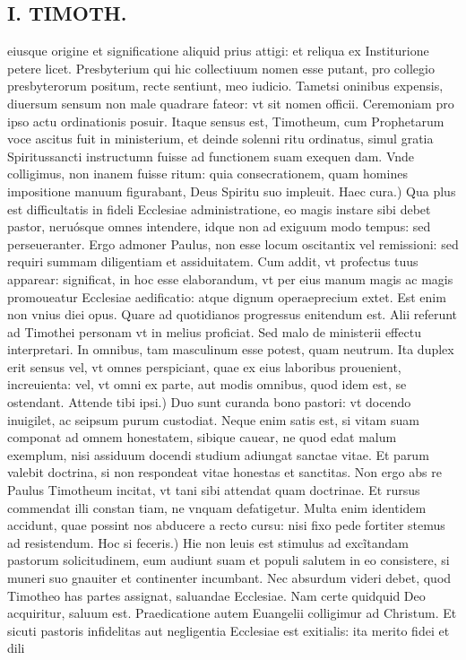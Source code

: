 \documentclass{article}
\begin{document}
\begin{pages}
\section*{I. TIMOTH. }
\marginpar{[ p.54 ]}\pstart eiusque origine et significatione aliquid prius attigi: et reliqua ex Institurione petere licet. Presbyterium qui hic collectiuum nomen esse putant, pro collegio presbyterorum positum, recte sentiunt, meo iudicio. Tametsi oninibus expensis, diuersum sensum non male quadrare fateor: vt sit nomen officii. Ceremoniam pro ipso actu ordinationis posuir. Itaque sensus est, Timotheum, cum Prophetarum voce ascitus fuit in ministerium, et deinde solenni ritu ordinatus, simul gratia Spiritussancti instructumn fuisse ad functionem suam exequen dam. Vnde colligimus, non inanem fuisse ritum: quia consecrationem, quam homines impositione manuum figurabant, Deus Spiritu suo impleuit.  \pend\pstart Haec cura.) Qua plus est difficultatis in fideli Ecclesiae administratione, eo magis instare sibi debet pastor, neruósque omnes intendere, idque non ad exiguum modo tempus: sed perseueranter. Ergo admoner Paulus, non esse locum oscitantix vel remissioni: sed requiri summam diligentiam et assiduitatem. Cum addit, vt profectus tuus apparear: significat, in hoc esse elaborandum, vt per eius manum magis ac magis promoueatur Ecclesiae aedificatio: atque dignum operaeprecium extet. Est enim non vnius diei opus. Quare ad quotidianos progressus enitendum est. Alii referunt ad Timothei personam vt in melius proficiat. Sed malo de ministerii effectu interpretari. In omnibus, tam masculinum esse potest, quam neutrum. Ita duplex erit sensus vel, vt omnes perspiciant, quae ex eius laboribus prouenient, increuienta: vel, vt omni ex parte, aut modis omnibus, quod idem est, se ostendant.  \pend\pstart Attende tibi ipsi.) Duo sunt curanda bono pastori: vt docendo inuigilet, ac seipsum purum custodiat. Neque enim satis est, si vitam suam componat ad omnem honestatem, sibique cauear, ne quod edat malum exemplum, nisi assiduum docendi studium adiungat sanctae vitae. Et parum valebit doctrina, si non respondeat vitae honestas et sanctitas. Non ergo abs re Paulus Timotheum incitat, vt tani sibi attendat quam doctrinae. Et rursus commendat illi constan tiam, ne vnquam defatigetur. Multa enim identidem accidunt, quae possint nos abducere a recto cursu: nisi fixo pede fortiter stemus ad resistendum.  \pend\pstart Hoc si feceris.) Hie non leuis est stimulus ad excĩtandam pastorum solicitudinem, eum audiunt suam et populi salutem in eo consistere, si muneri suo gnauiter et continenter incumbant. Nec absurdum videri debet, quod Timotheo has partes assignat, saluandae Ecclesiae. Nam certe quidquid Deo acquiritur, saluum est. Praedicatione autem Euangelii colligimur ad Christum. Et sicuti pastoris infidelitas aut negligentia Ecclesiae est exitialis: ita merito fidei et dili\pend

\end{pages}
\end{document}
